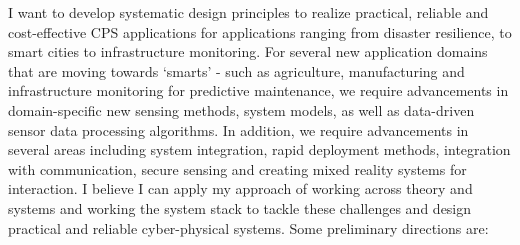 \documentclass[10pt]{article}
\begin{document}
I want to develop systematic design principles to realize practical, reliable and cost-effective CPS applications for applications ranging from disaster resilience, to smart cities to infrastructure monitoring. 
For several new application domains that are moving towards `smarts' - such as agriculture, manufacturing and infrastructure monitoring for predictive maintenance, we require advancements in domain-specific new sensing methods, system models, as well as data-driven sensor data processing algorithms.
In addition, we require advancements in several areas including system integration, rapid deployment methods, integration with communication, secure sensing and creating mixed reality systems for interaction. I believe I can apply my approach of working across theory and systems and working the system stack to tackle these challenges and design practical and reliable cyber-physical systems. Some preliminary directions are:
\end{document}
